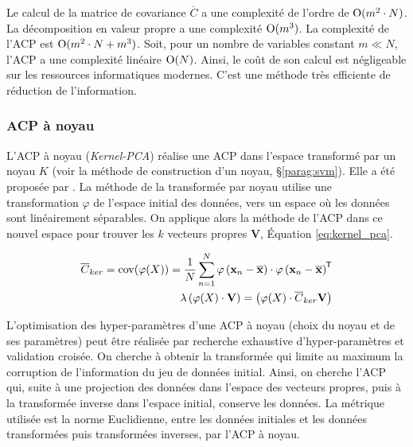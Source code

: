 Le calcul de la matrice de covariance $\overline{C}$ a une complexité de l'ordre de $\operatorname{O}(m^{2} \cdot N)$.
La décomposition en valeur propre a une complexité $\operatorname{O}(m^{3})$.
La complexité de l'ACP est $\operatorname{O}(m^{2} \cdot N+m^{3})$.
Soit, pour un nombre de variables constant $m \ll N$, l'ACP a une complexité linéaire $\operatorname{O}(N)$.
Ainsi, le coût de son calcul est négligeable sur les ressources informatiques modernes.
C'est une méthode très efficiente de réduction de l'information.

\subsubsection{ACP à noyau}\label{subsubsec:kpca}
L'ACP à noyau (\textit{Kernel-PCA}) réalise une ACP dans l'espace transformé par un noyau $K$ (voir la méthode de construction d'un noyau, §\ref{parag:svm}).
Elle a été proposée par \cite{scholkopf_kernel_1997, scholkopf_nonlinear_1998}.
La méthode de la transformée par noyau utilise une transformation $\varphi$ de l'espace initial des données, vers un espace où les données sont linéairement séparables.
On applique alors la méthode de l'ACP dans ce nouvel espace pour trouver les $k$ vecteurs propres $\mathbf{V}$, Équation \ref{eq:kernel_pca}.

\begin{equation} \label{eq:kernel_pca}
\begin{split}
\overline{C}_{ker}=\operatorname{cov}(\varphi(X))=\frac{1}{N} \sum_{n=1}^{N} \varphi\left(\mathbf{x}_{n}-\overline{\mathbf{x}}\right) \cdot \varphi\left(\mathbf{x}_{n}-\overline{\mathbf{x}}\right)^{\mkern-1.5mu\mathsf{T}}
\\
\lambda\left(\varphi(X) \cdot \mathbf{V}\right)=\left(\varphi(X) \cdot \overline{C}_{ker} \mathbf{V}\right)
\end{split}
\end{equation}

L'optimisation des hyper-paramètres d'une ACP à noyau (choix du noyau et de ses paramètres) peut être réalisée par recherche exhaustive d'hyper-paramètres et validation croisée.
On cherche à obtenir la transformée qui limite au maximum la corruption de l'information du jeu de données initial.
Ainsi, on cherche l'ACP qui, suite à une projection des données dans l'espace des vecteurs propres, puis à la transformée inverse dans l'espace initial, conserve les données.
La métrique utilisée est la norme Euclidienne, entre les données initiales et les données transformées puis transformées inverses, par l'ACP à noyau.

